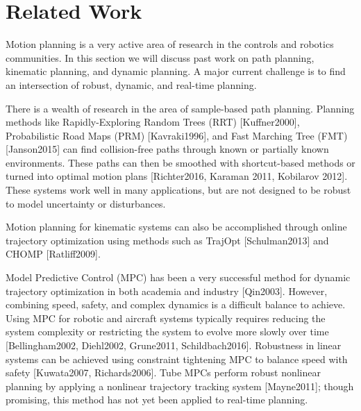 \section{Related Work \label{sec:relatedwork}}
Motion planning is a very active area of research in the controls and robotics communities.  In this section we will discuss past work on path planning, kinematic planning, and dynamic planning.  A major current challenge is to find an intersection of robust, dynamic, and real-time planning. 

There is a wealth of research in the area of sample-based path planning.  Planning methods like Rapidly-Exploring Random Trees (RRT) [Kuffner2000], Probabilistic Road Maps (PRM) [Kavraki1996], and Fast Marching Tree (FMT) [Janson2015] can find collision-free paths through known or partially known environments. These paths can then be smoothed with shortcut-based methods or turned into optimal motion plans [Richter2016, Karaman 2011, Kobilarov 2012].  These systems work well in many applications, but are not designed to be robust to model uncertainty or disturbances.

Motion planning for kinematic systems can also be accomplished through online trajectory optimization using methods such as TrajOpt [Schulman2013] and CHOMP [Ratliff2009].  

Model Predictive Control (MPC) has been a very successful method for dynamic trajectory optimization in both academia and industry [Qin2003].  However, combining speed, safety, and complex dynamics is a difficult balance to achieve.  Using MPC for robotic and aircraft systems typically requires reducing the system complexity or restricting the system to evolve more slowly over time [Bellingham2002, Diehl2002, Grune2011, Schildbach2016].  Robustness in linear systems can be achieved using constraint tightening MPC to balance speed with safety [Kuwata2007, Richards2006]. Tube MPCs perform robust nonlinear planning by applying a nonlinear trajectory tracking system [Mayne2011]; though promising, this method has not yet been applied to real-time planning.

